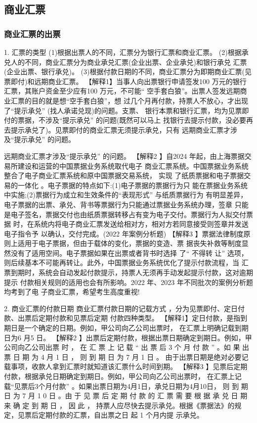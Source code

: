 \documentclass[UTF8,12pt]{ctexart}
\numberwithin{equation}{section} %
\numberwithin{figure}{section}
\numberwithin{table}{section}
\begin{document}
	
	
	\subsection{商业汇票}
	\subsubsection{商业汇票的出票} 
	1. 汇票的类型
	(1)根据出票人的不同，汇票分为银行汇票和商业汇票。 (2)根据承兑人的不同，商业汇票分为商业承兑汇票(企业出票、企业承兑)和银行承兑 汇票(企业出票、银行承兑)。 (3)根据付款日期的不同，商业汇票分为即期商业汇票(见票即付)和远期商业汇票。 【解释1】当事人向出票银行申请签发100 万元的银行汇票，其账户资金至少应有100 万元，不可能“ 空手套白狼”。出票人签发远期商业汇票的目的就是想“空手套白狼”，想 过几个月再付款，持票人不放心，才出现了“提示承兑” (找人承诺兑现)的问题。支票、 银行本票和银行汇票，均为见票即付的票据，不涉及“提示承兑” 的问题(既然可以马上 找银行去提示付款，没必要再去提示承兑了)。见票即付的商业汇票无须提示承兑，只有 远期商业汇票才涉及“提示承兑” 的问题。
	
	远期商业汇票才涉及“提示承兑” 的问题。
	【解释2 】自2024 年起，由上海票据交易所建设和运营的中国票据业务系统取代电子 商业汇票系统。中国票据业务系统整合了电子商业汇票系统和原中国票据交易系统， 实现 了纸质票据和电子票据交易的一体化 。电子票据的特点如下:(1)电子票据的票据行为只 能在票据业务系统中实施;(2)票据行为成立和生效条件的“表现形式” 与纸质票据行为 有明显差异，电子票据的出票、承兑、背书等票据行为只能通过票据业务系统办理，签章 只能是电子签名，票据交付也由纸质票据转移占有变为电子交付。票据行为人拟交付票据 时，在系统内将电子商业汇票发送给相对方，相对方若同意接受则签章并发送电子指令予 以确认，交付完成。(2022 年案例分析题)
	【解释3 】票据法律制度原则上适用于电子票据，但由于载体的变化，票据的变造、票 据丧失补救等制度显然没有了适用空间。电子票据如果在出票或者背书时选择 了“ 不得转 让” 选项，则后续基本不可能再转让。此外，中国票据业务系统优化了提示付款流程，当 汇票到期时，系统会自动发起付款提示，持票人无须再手动发起提示付款，这对逾期提示 付款相关规则的适用也会有所影响。2022 年、2023 年不同批次的案例分析题均考到了电 子商业汇票，希望考生高度重视!
	
	2. 商业汇票的付款日期
	商业汇票付款日期的记载方式 ，分为见票即付、定日付款、出票后定期付款和见票后定期 付款四种类型。
	【解释1】定日付款，是指到期日是一个确定的日期。例如，甲公司向乙公司出票时， 在汇票上明确记载到期日为6 月5 日。
	【解释2 】出票后定期付款，根据出票日期确定到期日。例如，甲公司向乙公司出票 时 ， 在 汇 票 上 记 载 “ 出 票 后 3 个 月 付 款 ” 。如 果 出 票 日 期 为 4 月 1 日 ， 则 到 期 日 为 7 月 1 日 。 由于出票日期是绝对必要记载事项，收款人拿到汇票时就知道该汇票什么时间到期。
	【解释3 】见票后定期付款，根据承兑日期确定到期日。例如，甲公司向乙公司出票时， 在汇票上记载“见票后3个月付款” 。如果出票日期为4月1日，承兑日期为4月10日， 则 到 期 日 为 7 月 1 0 日 。由 于 见 票 后 定 期 付 款 的 汇 票 需 要 根 据 承 兑 日 期 来 确 定 到 期 日 ， 因 此 ， 持票人应尽快去提示承兑。根据《票据法》的规定，见票后定期付款的汇票，自出票之日 起 1 个月内提 示承兑。
	
\end{document}
